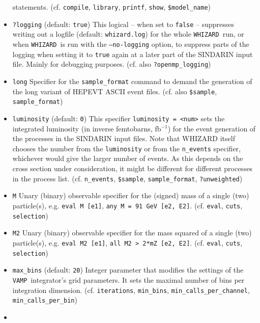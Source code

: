 \documentclass[12pt]{book}
\newcommand{\ttt}[1]{\texttt{#1}}
\newcommand{\whizard}{\texttt{WHIZARD}}
\newcommand{\vamp}{\texttt{VAMP}}
\begin{document}
\begin{itemize}
statements. (cf. \ttt{compile}, \ttt{library}, \ttt{printf},
\ttt{show}, \ttt{\$model\_name}) 
\item
\ttt{?logging} \qquad (default: \ttt{true}) \newline
This logical -- when set to \ttt{false} -- suppresses writing out a
logfile (default: \ttt{whizard.log}) for the whole \whizard\ run,
or when \whizard\ is run with the \ttt{--no-logging} option, to
suppress parts of the logging when setting it to \ttt{true} again at a
later part of the SINDARIN input file. Mainly for debugging purposes. 
(cf. also \ttt{?openmp\_logging})
\item
\ttt{long} \newline 
Specifier for the \ttt{sample\_format} command to demand the
generation of the long variant of HEPEVT ASCII event
files. (cf. also \ttt{\$sample}, 
\ttt{sample\_format}) 
\item
\ttt{luminosity} \qquad (default: \ttt{0}) \newline
This specifier \ttt{luminosity = <num>} sets the integrated luminosity
(in inverse femtobarns, fb${}^{-1}$) for the event generation of the
processes in the SINDARIN input 
files. Note that WHIZARD itself chooses the number from the
\ttt{luminosity} or from the \ttt{n\_events} specifier, whichever
would give the larger number of events. As this depends on the cross
section under consideration, it might be different for different
processes in the process list. 
(cf. \ttt{n\_events}, \ttt{\$sample}, \ttt{sample\_format},
\ttt{?unweighted}) 
\item
\ttt{M} \newline
Unary (binary) observable specifier for the (signed) mass of a single
(two) particle(s), e.g. \ttt{eval M [e1]}, \ttt{any M = 91 GeV [e2,
  E2]}. (cf. \ttt{eval}, \ttt{cuts}, \ttt{selection})
\item
\ttt{M2} \newline
Unary (binary) observable specifier for the mass squared of a single
(two) particle(s), e.g. \ttt{eval M2 [e1]}, \ttt{all M2 > 2*mZ [e2,
  E2]}. (cf. \ttt{eval}, \ttt{cuts}, \ttt{selection})
\item
\ttt{max\_bins} \qquad (default: \ttt{20}) \newline
Integer parameter that modifies the settings of the \vamp\
integrator's grid parameters. It sets the maximal number of bins per
integration dimension. (cf. \ttt{iterations}, \ttt{min\_bins},
\ttt{min\_calls\_per\_channel}, \ttt{min\_calls\_per\_bin})  
\item

\end{itemize}
\end{document}
